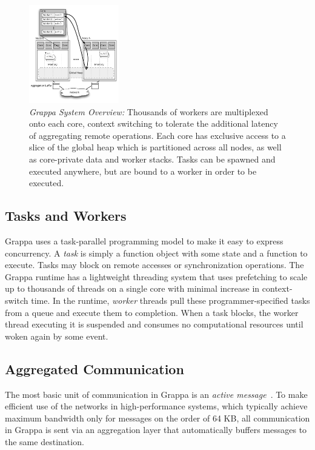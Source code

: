 \begin{figure}[t]
  \centering
  \includegraphics[width=0.35\textwidth]{figs/grappa_system.pdf}
  \caption{\emph{Grappa System Overview:}
    Thousands of workers are multiplexed onto each core, context switching to tolerate the additional latency of aggregating remote operations. Each core has exclusive access to a slice of the global heap which is partitioned across all nodes, as well as core-private data and worker stacks. Tasks can be spawned and executed anywhere, but are bound to a worker in order to be executed.
  }
  \label{fig:system}
\end{figure}

\subsection{Tasks and Workers}
Grappa uses a task-parallel programming model to make it easy to express concurrency.
A \emph{task} is simply a function object with some state and a function to execute.
Tasks may block on remote accesses or synchronization operations.
The Grappa runtime has a lightweight threading system that uses prefetching to scale up to thousands of threads on a single core with minimal increase in context-switch time.
In the runtime, \emph{worker} threads pull these programmer-specified tasks from a queue and execute them to completion. When a task blocks, the worker thread executing it is suspended and consumes no computational resources until woken again by some event.

\subsection{Aggregated Communication}
The most basic unit of communication in Grappa is an \emph{active message}~\cite{vonEicken92}.
To make efficient use of the networks in high-performance systems, which typically achieve maximum bandwidth only for messages on the order of 64 KB, all communication in Grappa is sent via an aggregation layer that automatically buffers messages to the same destination.

